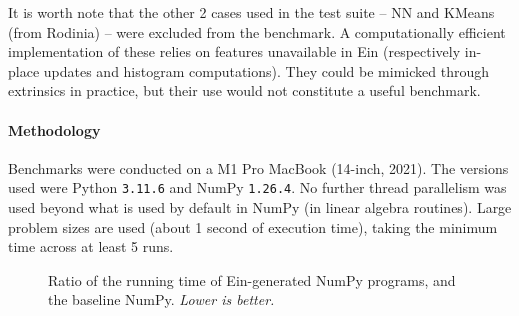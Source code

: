 It is worth note that the other 2 cases used in the test suite -- NN and KMeans (from Rodinia) -- were excluded from the benchmark. A computationally efficient implementation of these relies on features unavailable in Ein (respectively in-place updates and histogram computations). They could be mimicked through extrinsics in practice, but their use would not constitute a useful benchmark.

\paragraph{Methodology} Benchmarks were conducted on a M1 Pro MacBook (14-inch, 2021). The versions used were Python \texttt{3.11.6} and NumPy \texttt{1.26.4}. No further thread parallelism was used beyond what is used by default in NumPy (in linear algebra routines). Large problem sizes are used (about 1 second of execution time), taking the minimum time across at least 5 runs. 

\begin{figure}[b]
    \centering


    \caption{Ratio of the running time of Ein-generated NumPy programs, and the baseline NumPy. \textit{Lower is better.}}
    \label{fig:benchmark-results}
\end{figure}


